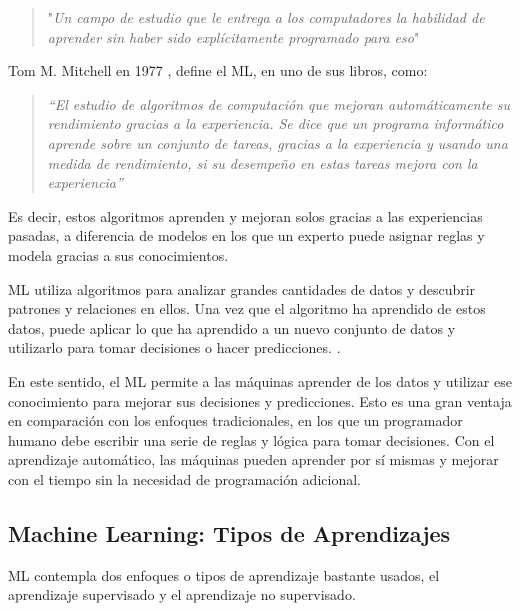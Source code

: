 \begin{quote}
	"\emph{Un campo de estudio que le entrega a los computadores la habilidad de aprender sin haber sido explícitamente programado para eso}"
\end{quote}


Tom M. Mitchell en 1977 \cite{mitchell1997machine}, define el ML, en uno de sus libros, como:
\begin{quote}
	\emph{“El estudio de algoritmos de computación que mejoran automáticamente su rendimiento gracias a la experiencia. Se dice que un programa informático aprende sobre un conjunto de tareas, gracias a la experiencia y usando una medida de rendimiento, si su desempeño en estas tareas mejora con la experiencia”}
\end{quote}

\par Es decir, estos algoritmos aprenden y mejoran solos gracias a las experiencias pasadas, a diferencia de modelos en los que un experto puede asignar reglas y modela gracias a sus conocimientos.\\
\par ML utiliza algoritmos para analizar grandes cantidades de datos y descubrir patrones y relaciones en ellos. Una vez que el algoritmo ha aprendido de estos datos, puede aplicar lo que ha aprendido a un nuevo conjunto de datos y utilizarlo para tomar decisiones o hacer predicciones. \cite{murdoch2019interpretable}.\\
\par En este sentido, el ML permite a las máquinas aprender de los datos y utilizar ese conocimiento para mejorar sus decisiones y predicciones. Esto es una gran ventaja en comparación con los enfoques tradicionales, en los que un programador humano debe escribir una serie de reglas y lógica para tomar decisiones. Con el aprendizaje automático, las máquinas pueden aprender por sí mismas y mejorar con el tiempo sin la necesidad de programación adicional.\\

\doublespacing
\subsection{Machine Learning: Tipos de Aprendizajes}
ML contempla dos enfoques o tipos de aprendizaje bastante usados, el aprendizaje supervisado y el aprendizaje no supervisado.\\


\doublespacing
